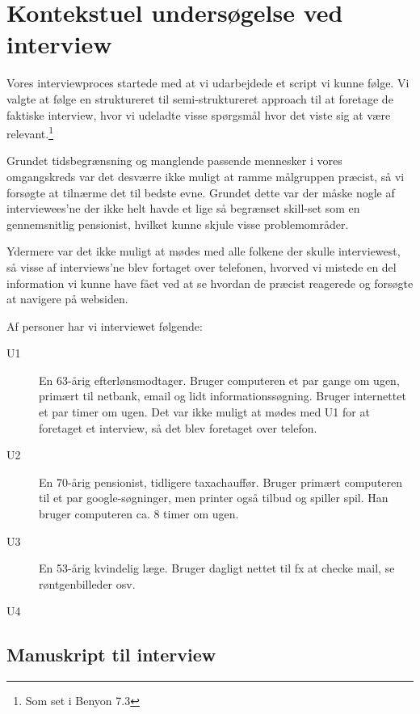 \section{Kontekstuel undersøgelse ved interview}

Vores interviewproces startede med at vi udarbejdede et script vi kunne følge. Vi valgte at følge en struktureret til semi-struktureret approach til at foretage de faktiske interview, hvor vi udeladte visse spørgsmål hvor det viste sig at være relevant.\footnote{Som set i Benyon 7.3}

Grundet tidsbegrænsning og manglende passende mennesker i vores omgangskreds var det desværre ikke muligt at ramme målgruppen præcist, så vi forsøgte at tilnærme det til bedste evne. Grundet dette var der måske nogle af interviewees'ne der ikke helt havde et lige så begrænset skill-set som en gennemsnitlig pensionist, hvilket kunne skjule visse problemområder.

Ydermere var det ikke muligt at mødes med alle folkene der skulle interviewest, så visse af interviews'ne blev fortaget over telefonen, hvorved vi mistede en del information vi kunne have fået ved at se hvordan de præcist reagerede og forsøgte at navigere på websiden.

Af personer har vi interviewet følgende:

\begin{description}
    \item[U1] {
        En 63-årig efterlønsmodtager. Bruger computeren et par gange om ugen, primært til netbank, email og lidt informationssøgning. Bruger internettet et par timer om ugen. Det var ikke muligt at mødes med U1 for at foretaget et interview, så det blev foretaget over telefon.
    }
    \item[U2] {
        En 70-årig pensionist, tidligere taxachauffør. Bruger primært computeren til et par google-søgninger, men printer også tilbud og spiller spil. Han bruger computeren ca. 8 timer om ugen.
    }
    \item[U3] {
    En 53-årig kvindelig læge. Bruger dagligt nettet til fx at checke mail, se røntgenbilleder osv.
    }
    \item[U4] {
    }
\end{description}

\subsection{Manuskript til interview}

